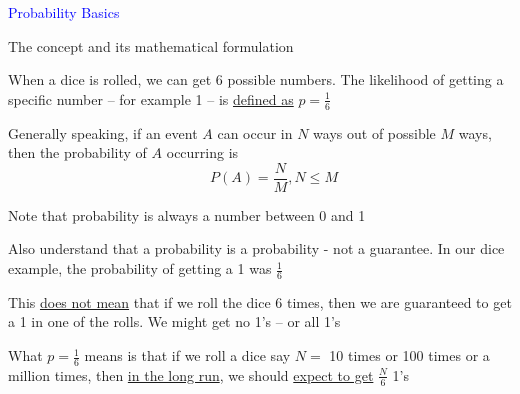 \documentclass[14pt,fleqn]{extarticle}
\begin{document}
 
\begin{skill}
\textcolor{blue}{Probability Basics}

The concept and its mathematical formulation 
\end{skill}

\newcard 

When a dice is rolled, we can get 6 possible numbers. The likelihood of getting a specific number -- for example 1 -- is \underline{defined as} $p = \frac{1}{6}$ \newline 

Generally speaking, if an event $A$ can occur in $N$ ways out of possible $M$ ways, then the probability of $A$ occurring is \[\qquad P(A) = \dfrac{N}{M}, N\leq M\]

Note that probability is always a number between 0 and 1\newline 

Also understand that a probability is a probability - not a guarantee. In our dice example, the probability of getting a 1 was $\frac{1}{6}$ \newline 

This \underline{does not mean} that if we roll the dice 6 times, then we are 
guaranteed to get a 1 in one of the rolls. We might get no 1's -- or all 1's\newline 

What $p= \frac{1}{6}$ means is that if we roll a dice say $N =$ 10 times or 100 times or a million times, then \underline{in the long run}, we should \underline{expect to get} $\frac{N}{6}$ 1's
\end{document}

